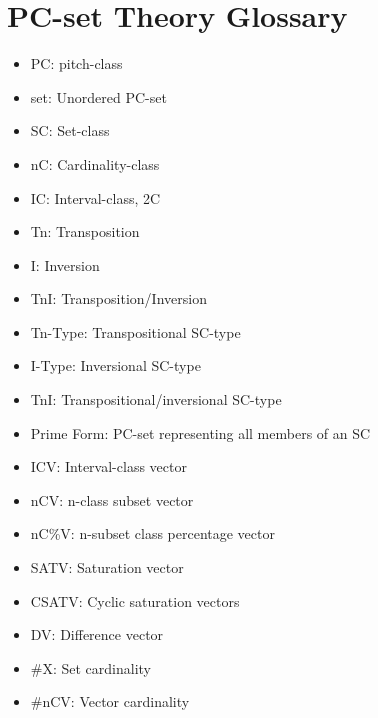 \documentclass{article}
\begin{document}
\pagebreak
\section{PC-set Theory Glossary}
\label{sec-6}

\begin{itemize}
\item PC: pitch-class
\item set: Unordered PC-set
\item SC: Set-class
\item nC: Cardinality-class
\item IC: Interval-class, 2C
\item Tn: Transposition
\item I: Inversion
\item TnI: Transposition/Inversion
\item Tn-Type: Transpositional SC-type
\item I-Type: Inversional SC-type
\item TnI: Transpositional/inversional SC-type
\item Prime Form: PC-set representing all members of an SC
\item ICV: Interval-class vector
\item nCV: n-class subset vector
\item nC\%V: n-subset class percentage vector
\item SATV: Saturation vector
\item CSATV: Cyclic saturation vectors
\item DV: Difference vector
\item \#X: Set cardinality
\item \#nCV: Vector cardinality
\end{itemize}



\end{document}
